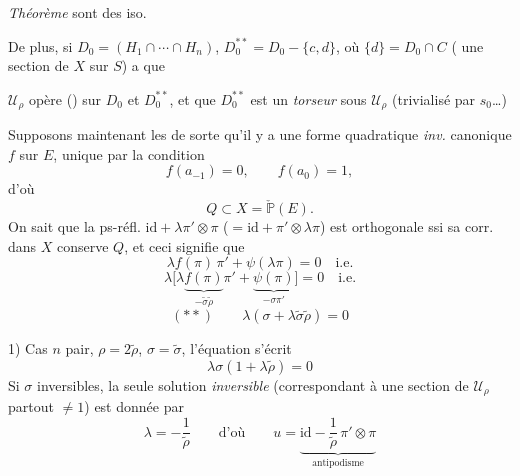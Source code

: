 \documentclass[11pt,a4paper]{article}
\begin{document}
\emph{Théorème}  sont des iso.

De plus, si $D_0 = (H_1 \cap \cdots \cap H_n)$, $D_0^{**} = D_0 - \{c, d\}$, où $\{d\} = D_0 \cap C$ ( une section de $X$ sur $S$)  a que

$\mathcal{U}_\rho$ opère () sur $D_0$ et $D_0^{**}$, et que $D_0^{**}$ est un \emph{torseur} sous $\mathcal{U}_\rho$ (trivialisé par $s_0$\ldots)


Supposons maintenant les  de sorte qu'il y a une forme quadratique \emph{inv.} canonique $f$ sur $E$, unique par la condition
\[
f(a_{-1}) = 0, \qquad f(a_0) = 1,
\]
 d'où
\[
Q \subset X = \check{\mathbb{P}}(E).
\]
On sait que la ps-réfl. $\mathrm{id} + \lambda\pi'\otimes\pi$ ($= \mathrm{id} + \pi' \otimes \lambda\pi$) est \struck{\ill{}} orthogonale ssi sa  corr. dans $X$ conserve $Q$, et ceci signifie que
\[
\lambda f(\pi)\,\pi' + \psi(\lambda\pi) = 0 \quad \text{i.e.}
\]
\[
\lambda\bigl[\lambda\underbrace{f(\pi)}_{-\tilde{\sigma}\tilde{\rho}}\pi' + \underbrace{\psi(\pi)}_{-\sigma\pi'}\bigr] = 0 \quad \text{i.e.}
\]
\[
(**) \qquad \lambda(\sigma + \lambda\tilde{\sigma}\tilde{\rho}) = 0
\]

1) Cas $n$ pair, $\rho = 2\tilde{\rho}$, $\sigma = \tilde{\sigma}$, l'équation s'écrit
\[
\lambda\sigma(1 + \lambda\tilde{\rho}) = 0
\]
Si $\sigma$ \struck{\ill{}}  inversibles, la seule solution \emph{inversible}  (correspondant à une section de $\mathcal{U}_\rho$ partout $\neq 1$) est donnée par
\[
\lambda = -\frac{1}{\tilde{\rho}} \qquad \text{d'où} \qquad u = \underbrace{\mathrm{id} - \frac{1}{\tilde{\rho}}\,\pi' \otimes \pi}_{\text{antipodisme}}
\]
\end{document}
